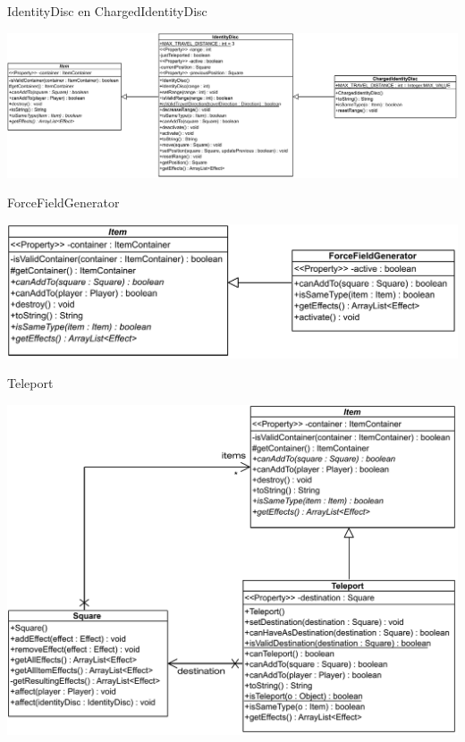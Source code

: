 \documentclass[11pt,t]{beamer}
\begin{document}
\begin{frame}{IdentityDisc en ChargedIdentityDisc}
\vspace{0.35in}
\begin{center}
\includegraphics[width=0.95\linewidth]{images/identitydisc}
\end{center}
\end{frame}

\begin{frame}{ForceFieldGenerator}
\vspace{0.4in}
\begin{center}
\includegraphics[width=0.95\linewidth]{images/ForceFieldGenerator}
\end{center}
\end{frame}

\begin{frame}{Teleport}
\begin{center}
\includegraphics[width=0.80\linewidth]{images/teleport}
\end{center}
\end{frame}
\end{document}
